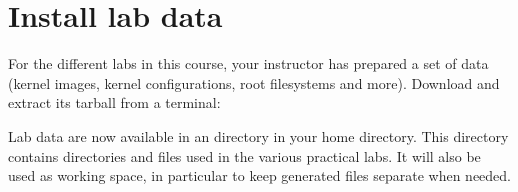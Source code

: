 
\section{Install lab data}

For the different labs in this course, your instructor has prepared a
set of data (kernel images, kernel configurations, root filesystems
and more). Download and extract its tarball from a terminal:

{\small
{}
}

Lab data are now available in an  directory in
your home directory. This directory contains directories and files used in
the various practical labs. It will also be used as working space,
in particular to keep generated files separate when needed.
